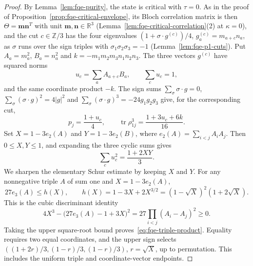 \begin{proof}
By Lemma~\ref{lem:fqe-purity}, the state is critical with $\tau=0$. As in the proof of
Proposition~\ref{prop:fqe-critical-envelope}, its Bloch correlation matrix is then $\Theta=\mathbf m\mathbf n^T$ with unit
$\mathbf m,\mathbf n\in\mathbb R^3$ (Lemma~\ref{lem:fqe-critical-correlation}(2) at $\kappa=0$), and the cut $c\in\mathbb Z/3$ has the
four eigenvalues $(1+\sigma\cdot g^{(c)})/4$, $g^{(c)}_a=m_{a+c}n_a$, as $\sigma$ runs over the sign triples with
$\sigma_1\sigma_2\sigma_3=-1$ (Lemma~\ref{lem:fqe-p1-cuts}). Put $A_a=m_a^2$, $B_a=n_a^2$ and $k=-m_1m_2m_3n_1n_2n_3$.
The three vectors $g^{(c)}$ have squared norms
\[
u_c=\sum_aA_{a+c}B_a,\qquad \sum_cu_c=1,
\]
and the same coordinate product $-k$. The sign sums $\sum_\sigma\sigma\cdot g=0$, $\sum_\sigma(\sigma\cdot g)^2=4|g|^2$ and
$\sum_\sigma(\sigma\cdot g)^3=-24g_1g_2g_3$ give, for the corresponding cut,
\[
p_j=\frac{1+u_c}{4},\qquad
\operatorname{tr}\rho_{1j}^3=\frac{1+3u_c+6k}{16}.
\]
Set $X=1-3e_2(A)$ and $Y=1-3e_2(B)$, where $e_2(A)=\sum_{i<j}A_iA_j$.
Then $0\le X,Y\le1$, and expanding the three cyclic sums gives
\[
\sum_c u_c^2=\frac{1+2XY}{3}.
\]
We sharpen the elementary Schur estimate by keeping $X$ and $Y$.
For any nonnegative triple $A$ of sum one and $X=1-3e_2(A)$,
\[
27e_3(A)\le h(X),\qquad
h(X)=1-3X+2X^{3/2}=(1-\sqrt X)^2(1+2\sqrt X).
\tag{RP}\label{eq:fqe-triple-product}
\]
This is the cubic discriminant identity
\[
 4X^3-\bigl(27e_3(A)-1+3X\bigr)^2
   =27\prod_{i<j}(A_i-A_j)^2\ge0.
\]
Taking the upper square-root bound proves~\eqref{eq:fqe-triple-product}.
Equality requires two equal coordinates, and the upper sign selects
$((1+2r)/3,(1-r)/3,(1-r)/3)$, $r=\sqrt X$, up to permutation.
This includes the uniform triple and coordinate-vector endpoints.


\end{proof}
